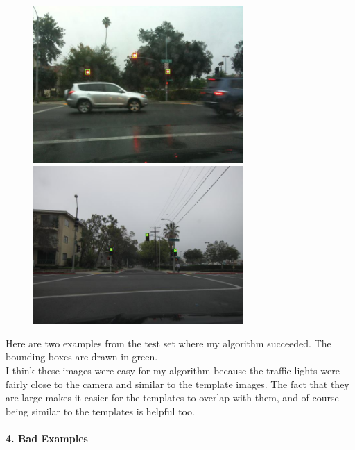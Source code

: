 \documentclass[12pt,letterpaper]{article} \usepackage{fullpage}
\begin{document}
\begin{figure}[htp]
    \centering
    \includegraphics[width=8cm]{img/RL-049.jpg}
    \includegraphics[width=8cm]{img/RL-271.jpg}
\end{figure}
Here are two examples from the test set where my algorithm succeeded.
The bounding boxes are drawn in green.\\
I think these images were easy for my algorithm because the traffic lights were
fairly close to the camera and similar to the template images. The fact that they are large makes
it easier for the templates to overlap with them, and of course being similar to the
templates is helpful too.
\\\\
\textbf{4. Bad Examples}
\end{document}
